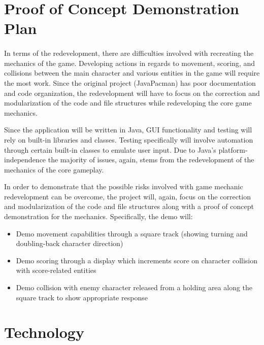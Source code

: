 \documentclass{article}
\begin{document}
\section{Proof of Concept Demonstration Plan}

\paragraph{}
In terms of the redevelopment, there are difficulties involved with recreating the mechanics of the game. Developing actions in regards to movement, scoring, and collisions between the main character and various entities in the game will require the most work. Since the original project (JavaPacman) has poor documentation and code organization, the redevelopment will have to focus on the correction and modularization of the code and file structures while redeveloping the core game mechanics.\par Since the application will be written in Java, GUI functionality and testing will rely on built-in libraries and classes. Testing specifically will involve automation through certain built-in classes to emulate user input. Due to Java's platform-independence the majority of issues, again, stems from the redevelopment of the mechanics of the core gameplay.\par In order to demonstrate that the possible risks involved with game mechanic redevelopment can be overcome, the project will, again, focus on the correction and modularization of the code and file structures along with a proof of concept demonstration for the mechanics. Specifically, the demo will:
\begin{itemize}
\item Demo movement capabilities through a square track (showing turning and doubling-back character direction)
\item Demo scoring through a display which increments score on character collision with score-related entities
\item Demo collision with enemy character released from a holding area along the square track to show appropriate response
\end{itemize}   

\section{Technology}
\end{document}
